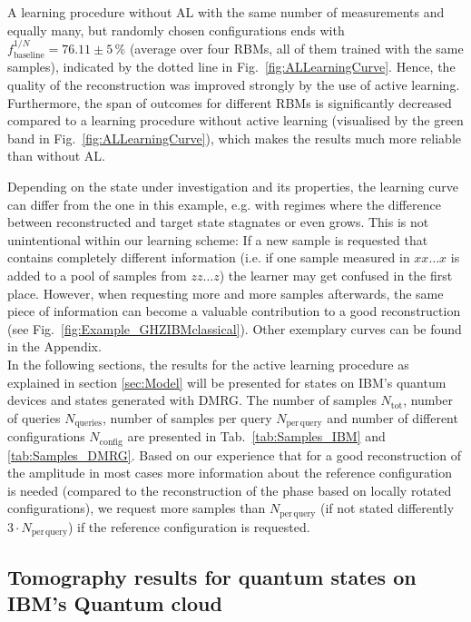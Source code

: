 \documentclass[pra,aps,showpacs,groupedaddress,superscriptaddress,twocolumn,toc=flat,biblatex,footinbib]{revtex4-1}
\begin{document}
A learning procedure without AL with the same number of measurements and equally many, but randomly chosen configurations ends with $f^{1/N}_{\mathrm{baseline}}=76.11\pm 5\,\%$ (average over four RBMs, all of them trained with the same samples), indicated by the dotted line in Fig.~\ref{fig:ALLearningCurve}. Hence, the quality of the reconstruction was improved strongly by the use of active learning. Furthermore, the span of outcomes for different RBMs is significantly decreased compared to a learning procedure without active learning (visualised by the green band in Fig.~\ref{fig:ALLearningCurve}), which makes the results much more reliable than without AL. 

Depending on the state under investigation and its properties, the learning curve can differ from the one in this example, e.g. with regimes where the difference between reconstructed and target state stagnates or even grows. This is not unintentional within our learning scheme: If a new sample is requested that contains completely different information (i.e. if one sample measured in $xx\dots x$ is added to a pool of samples from $zz\dots z$) the learner may get confused in the first place. However, when requesting more and more samples afterwards, the same piece of information can become a valuable contribution to a good reconstruction (see Fig.~\ref{fig:Example_GHZIBMclassical}).  Other exemplary curves can be found in the Appendix.\\


In the following sections, the results for the active learning procedure as explained in section \ref{sec:Model} will be presented for states on IBM's quantum devices and states generated with DMRG. The number of samples $N_{\mathrm{tot}}$, number of queries $N_{\mathrm{queries}}$, number of samples per query $N_{\mathrm{per\,query}}$ and number of different configurations $N_{\mathrm{config}}$ are presented in Tab.~\ref{tab:Samples_IBM} and \ref{tab:Samples_DMRG}. Based on our experience that for a good reconstruction of the amplitude in most cases more information about the reference configuration is needed (compared to the reconstruction of the phase based on locally rotated configurations), we request more samples than $N_{\mathrm{per\,query}}$ (if not stated differently $3\cdot N_{\mathrm{per\,query}}$) if the reference configuration is requested.


\subsection{Tomography results for quantum states on IBM's Quantum cloud \label{sec:States_IBM}}
\end{document}
